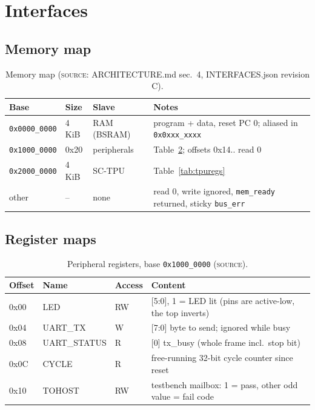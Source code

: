 \documentclass[10pt,a4paper]{article}
\newcommand{\lbl}[1]{\textsc{#1}}          %
\begin{document}
\section{Interfaces}
\label{sec:if}

\subsection{Memory map}
\begin{table}[htbp]
\centering\small
\caption{Memory map (\lbl{source}: ARCHITECTURE.md sec.~4, INTERFACES.json
revision C).}\label{tab:memmap}
\begin{tabular}{@{}llll@{}}
\toprule
Base & Size & Slave & Notes\\
\midrule
\texttt{0x0000\_0000} & 4\,KiB & RAM (BSRAM) & program + data, reset PC 0; aliased in \texttt{0x0xxx\_xxxx} \\
\texttt{0x1000\_0000} & 0x20 & peripherals & Table~\ref{tab:periph}; offsets 0x14.. read 0 \\
\texttt{0x2000\_0000} & 4\,KiB & SC-TPU & Table~\ref{tab:tpuregs} \\
other & -- & none & read 0, write ignored, \texttt{mem\_ready} returned, sticky \texttt{bus\_err} \\
\bottomrule
\end{tabular}
\end{table}

\subsection{Register maps}
\begin{table}[htbp]
\centering\small
\caption{Peripheral registers, base \texttt{0x1000\_0000} (\lbl{source}).}\label{tab:periph}
\begin{tabular}{@{}llll@{}}
\toprule
Offset & Name & Access & Content\\
\midrule
0x00 & LED & RW & [5:0], 1 = LED lit (pins are active-low, the top inverts)\\
0x04 & UART\_TX & W & [7:0] byte to send; ignored while busy\\
0x08 & UART\_STATUS & R & [0] tx\_busy (whole frame incl.\ stop bit)\\
0x0C & CYCLE & R & free-running 32-bit cycle counter since reset\\
0x10 & TOHOST & RW & testbench mailbox: 1 = pass, other odd value = fail code\\
\bottomrule
\end{tabular}
\end{table}
\end{document}
